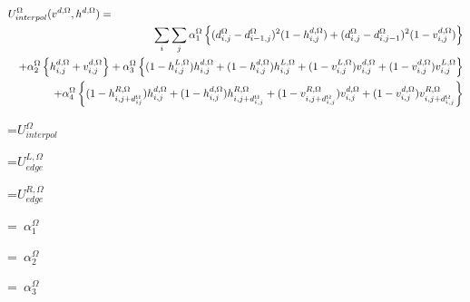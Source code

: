 {\newpage
\clearpage
\samepage \begin{eqnarray}%
\lefteqn{U_{interpol}^{\Omega}(v^{d, \Omega},h^{d, \Omega}) =} \nonumber \\ 
& & \sum_{i} \sum_{j}  \alpha_1^{\Omega} \left \{ (d^{\Omega}_{i,j}-d^{\Omega}_{i-1,j})^2 
(1-h_{i,j}^{d, \Omega})
+  (d^{\Omega}_{i,j}-d^{\Omega}_{i,j-1})^2 (1-v_{i,j}^{d, \Omega}) \right \}
\nonumber \\ 
& & + \alpha_2^{\Omega} \left \{ h_{i,j}^{d, \Omega}  +  v_{i,j}^{d, \Omega} \right \} 
+ \alpha_3^{\Omega} \left \{ (1-h_{i,j}^{L, \Omega} )h_{i,j}^{d, \Omega} +
(1-h_{i,j}^{d, \Omega})h_{i,j}^{L, \Omega  }
+  (1-v_{i,j}^{L, \Omega} )v_{i,j}^{d, \Omega} + (1-v_{i,j}^{d, \Omega})
v_{i,j}^{L, \Omega}  \right \} \nonumber \\ 
& &  + \alpha_4^{\Omega} \left \{ (1-h_{i,j+d^{\Omega}_{ij}}^{R, \Omega})h_{i,j}^{d, \Omega}
+ (1-h_{i,j}^{d, \Omega})h_{i,j+d^{\Omega}_{i,j}}^{R, \Omega  }
+  (1-v_{i,j+d^{\Omega}_{i,j}}^{R, \Omega})v_{i,j}^{d, \Omega} +
(1-v_{i,j}^{d, \Omega})v_{i,j+d^{\Omega}_{i,j}}^{R, \Omega} \right \}
\end{eqnarray}
}

{\newpage
\clearpage
\samepage \setbox\sizebox=\hbox{$U^{\Omega}_{interpol}$}\box\sizebox
}

{\newpage
\clearpage
\samepage \setbox\sizebox=\hbox{$U_{edge}^{L, \Omega} $}\box\sizebox
}

{\newpage
\clearpage
\samepage \setbox\sizebox=\hbox{$U_{edge}^{R, \Omega}$}\box\sizebox
}

{\newpage
\clearpage
\samepage \setbox\sizebox=\hbox{%
$\alpha_1^{\Omega}$}\box\sizebox
}

{\newpage
\clearpage
\samepage \setbox\sizebox=\hbox{%
$\alpha_2^{\Omega}$}\box\sizebox
}

{\newpage
\clearpage
\samepage \setbox\sizebox=\hbox{%
$\alpha_3^{\Omega}$}\box\sizebox
}

